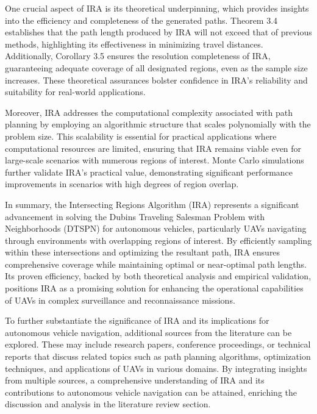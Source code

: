 \vspace*{6mm}

One crucial aspect of IRA is its theoretical underpinning, which provides insights into the efficiency and completeness of the generated paths. Theorem 3.4 establishes that the path length produced by IRA will not exceed that of previous methods, highlighting its effectiveness in minimizing travel distances. Additionally, Corollary 3.5 ensures the resolution completeness of IRA, guaranteeing adequate coverage of all designated regions, even as the sample size increases. These theoretical assurances bolster confidence in IRA's reliability and suitability for real-world applications.

\vspace*{6mm}

Moreover, IRA addresses the computational complexity associated with path planning by employing an algorithmic structure that scales polynomially with the problem size. This scalability is essential for practical applications where computational resources are limited, ensuring that IRA remains viable even for large-scale scenarios with numerous regions of interest. Monte Carlo simulations further validate IRA's practical value, demonstrating significant performance improvements in scenarios with high degrees of region overlap.

\vspace*{6mm}

In summary, the Intersecting Regions Algorithm (IRA) represents a significant advancement in solving the Dubins Traveling Salesman Problem with Neighborhoods (DTSPN) for autonomous vehicles, particularly UAVs navigating through environments with overlapping regions of interest. By efficiently sampling within these intersections and optimizing the resultant path, IRA ensures comprehensive coverage while maintaining optimal or near-optimal path lengths. Its proven efficiency, backed by both theoretical analysis and empirical validation, positions IRA as a promising solution for enhancing the operational capabilities of UAVs in complex surveillance and reconnaissance missions.

\vspace*{6mm}

To further substantiate the significance of IRA and its implications for autonomous vehicle navigation, additional sources from the literature can be explored. These may include research papers, conference proceedings, or technical reports that discuss related topics such as path planning algorithms, optimization techniques, and applications of UAVs in various domains. By integrating insights from multiple sources, a comprehensive understanding of IRA and its contributions to autonomous vehicle navigation can be attained, enriching the discussion and analysis in the literature review section.


